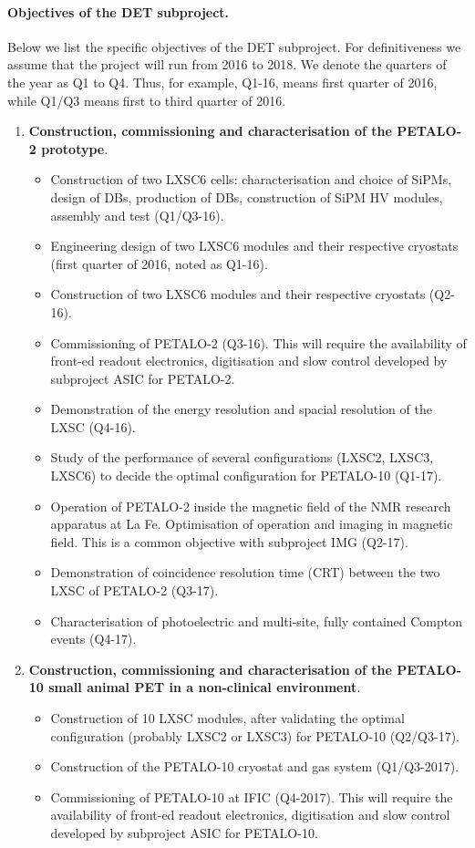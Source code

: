 \paragraph{Objectives of the DET subproject.}
Below we list the specific objectives of the DET subproject. For definitiveness we assume that the project will run from 2016 to 2018. We denote the quarters of the year as Q1 to Q4. Thus, for example, Q1-16, means first quarter of 2016, while Q1/Q3 means first to third quarter of 2016. 

\begin{enumerate}
\item {\bf Construction, commissioning and characterisation of the PETALO-2 prototype}. 
\begin{itemize}
\item Construction of two LXSC6 cells: characterisation and choice of SiPMs, design of DBs, production of DBs, construction of SiPM HV modules, assembly and test (Q1/Q3-16).  
\item Engineering design of two LXSC6 modules and their respective cryostats (first quarter of 2016, noted as Q1-16). 
\item Construction of two LXSC6 modules and their respective cryostats (Q2-16).
\item Commissioning of PETALO-2 (Q3-16). This will require the availability of front-ed readout electronics, digitisation and slow control developed by subproject ASIC for PETALO-2.
\item Demonstration of the energy resolution and spacial resolution of the LXSC (Q4-16). 
\item Study of the performance of several configurations (LXSC2, LXSC3, LXSC6) to decide the optimal configuration for PETALO-10 (Q1-17). 
\item Operation of PETALO-2 inside the magnetic field of the NMR research apparatus at La Fe. Optimisation of operation and imaging in magnetic field. This is a common objective with subproject IMG (Q2-17). 
\item Demonstration of coincidence resolution time (CRT) between the two LXSC of PETALO-2 (Q3-17). 
\item Characterisation of photoelectric and multi-site, fully contained Compton 
events (Q4-17). 
\end{itemize}
\item {\bf Construction, commissioning and characterisation of the PETALO-10 small animal PET in a non-clinical environment}. 
\begin{itemize}
\item Construction of 10 LXSC modules, after validating the optimal configuration (probably LXSC2 or LXSC3) for PETALO-10 (Q2/Q3-17). 
\item Construction of the PETALO-10 cryostat  and gas system (Q1/Q3-2017).
\item Commissioning of PETALO-10 at IFIC (Q4-2017). This will require the availability of front-ed readout electronics, digitisation and slow control developed by subproject ASIC for PETALO-10.
\end{itemize}
\end{enumerate}
